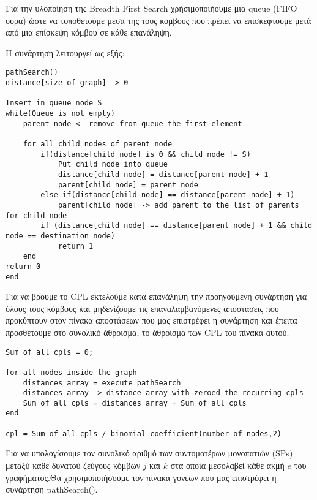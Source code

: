 \documentclass{article}
\begin{document}
Για την υλοποίηση της  Breadth First Search χρήσιμοποιήουμε μια queue (FIFO ούρα) ώστε να τοποθετούμε μέσα της τους κόμβους που πρέπει να επισκεφτούμε μετά από μια επίσκεψη κόμβου σε κάθε επανάληψη.\bigbreak

Η συνάρτηση λειτουργεί ως εξής:

\begin{lstlisting}
pathSearch()
distance[size of graph] -> 0

Insert in queue node S
while(Queue is not empty)
	parent node <- remove from queue the first element
	
	for all child nodes of parent node
		if(distance[child node] is 0 && child node != S)
			Put child node into queue
			distance[child node] = distance[parent node] + 1
			parent[child node] = parent node
		else if(distance[child node] == distance[parent node] + 1)
			parent[child node] -> add parent to the list of parents for child node
		if (distance[child node] == distance[parent node] + 1 && child node == destination node)
			return 1
	end	
return 0
end
\end{lstlisting}\bigbreak
{}

Για να βρούμε το CPL εκτελούμε κατα επανάληψη την προηγούμενη συνάρτηση για όλους τους κόμβους και μηδενίζουμε τις επαναλαμβανόμενες αποστάσεις που προκύπτουν στον πίνακα αποστάσεων που μας επιστρέφει η συνάρτηση και έπειτα προσθέτουμε στο συνολικό άθροισμα, το άθροισμα των CPL του πίνακα αυτού.\pagebreak

\begin{lstlisting}
Sum of all cpls = 0;

for all nodes inside the graph
	distances array = execute pathSearch
	distances array -> distance array with zeroed the recurring cpls
	Sum of all cpls = distances array + Sum of all cpls
end

cpl = Sum of all cpls / binomial coefficient(number of nodes,2)
\end{lstlisting}\bigbreak
{}

Για να υπολογίσουμε τον συνολικό αριθμό των συντομοτέρων μονοπατιών (SPs) μεταξύ κάθε δυνατού ζεύγους κόμβων $j$ και $k$ στα οποία μεσολαβεί κάθε ακμή $e$ του γραφήματος.Θα χρησιμοποιήσουμε τον πίνακα γονέων που μας επιστρέφει η συνάρτηση
pathSearch().\bigbreak
\end{document}
